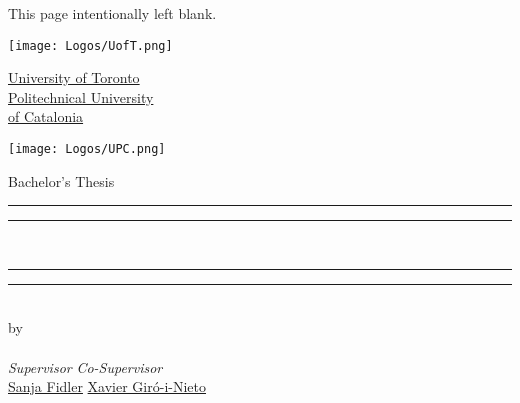 

\begin{titlepage}
  \hypersetup{
    urlcolor = black
  }
  
\end{titlepage}
\restoregeometry


\cleardoublepage
\thispagestyle{empty}
\null\vfill
\begin{center}
  This page intentionally left blank.
\end{center}
\vfill\null


\cleardoublepage
\begin{titlepage}
  \makeatletter
  \hypersetup{
    urlcolor = black
  }

  \centering
  \scshape \Large

  \begin{minipage}[c]{.2\textwidth}
    \texttt{[image: Logos/UofT.png]}
  \end{minipage} \hfill
  \begin{minipage}[c]{.5\textwidth}
    \centering
    \href{https://href.com}{University of Toronto} \\[2ex]
    \href{https://href.com}{Politechnical University \\ of Catalonia}
  \end{minipage} \hfill
  \begin{minipage}[c]{.2\textwidth}
    \texttt{[image: Logos/UPC.png]}
  \end{minipage}

  \vfill

  Bachelor's Thesis \\[-1.5ex]
  \LARGE
  \rule{\textwidth}{1.6pt}\vspace*{-\baselineskip}\vspace*{2pt}
  \rule{\textwidth}{0.4pt}
  \textbf{\href{https://href.com}{\@title}} \\[-1ex]
  \rule{\textwidth}{0.4pt}\vspace*{-\baselineskip}\vspace*{3.2pt}
  \rule{\textwidth}{1.6pt} \\
  \Large
  by \\
  \LARGE
  \textbf{\href{http://href.com}{\@author}} \\[1ex]
  \large
  \noindent \textsl{Supervisor} \hfill \textsl{Co-Supervisor} \\
  \href{https://href.com}{Sanja Fidler}\hfill
  \href{https://href.com}{Xavier Giró-i-Nieto}


\end{titlepage}
